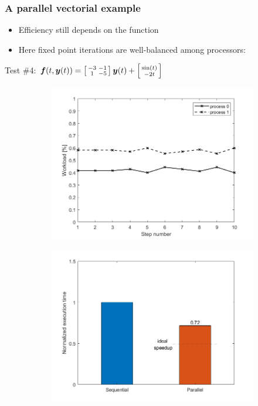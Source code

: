\documentclass{beamer}
\begin{document}
\begin{frame} %
	\frametitle{A parallel vectorial example}
	\begin{itemize}
		\item Efficiency still depends on the function
		\item Here fixed point iterations are well-balanced among processors:
	\end{itemize}	
	\begin{center}
		Test \#4: \quad
		$\boldsymbol f(t,\boldsymbol y(t)) =
		\left[\begin{smallmatrix} -3 & -1 \\ 1 & -5 \end{smallmatrix}\right]
		\boldsymbol y(t) +
		\left[\begin{smallmatrix} \sin(t) \\ -2t \end{smallmatrix}\right]$
	\end{center}
	\begin{figure}
		\begin{subfigure}{.5\textwidth}
			\includegraphics[width=\linewidth]{etc/test4_1.jpeg}
		\end{subfigure}%
		\begin{subfigure}{.5\textwidth}
			\includegraphics[width=\linewidth]{etc/test4_2.jpeg}

\end{subfigure}
\end{figure}
\end{frame}
\end{document}
